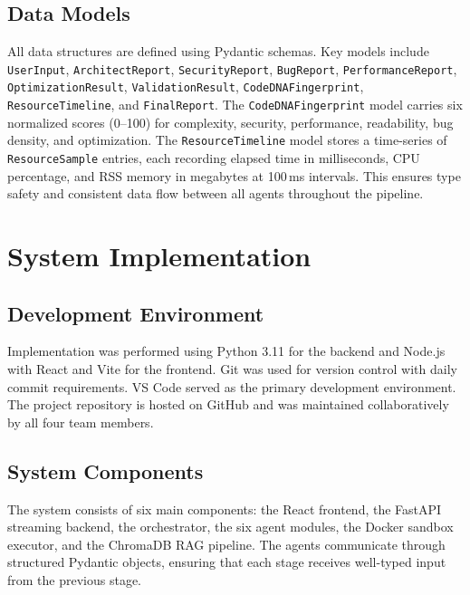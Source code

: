 \subsection{Data Models}
All data structures are defined using Pydantic schemas. Key models include \texttt{UserInput}, \texttt{ArchitectReport}, \texttt{SecurityReport}, \texttt{BugReport}, \texttt{PerformanceReport}, \texttt{OptimizationResult}, \texttt{ValidationResult}, \texttt{CodeDNAFingerprint}, \texttt{ResourceTimeline}, and \texttt{FinalReport}. The \texttt{CodeDNAFingerprint} model carries six normalized scores (0--100) for complexity, security, performance, readability, bug density, and optimization. The \texttt{ResourceTimeline} model stores a time-series of \texttt{ResourceSample} entries, each recording elapsed time in milliseconds, CPU percentage, and RSS memory in megabytes at 100\,ms intervals. This ensures type safety and consistent data flow between all agents throughout the pipeline.

\clearpage
\section{System Implementation}
\label{sec:implementation}

\subsection{Development Environment}
Implementation was performed using Python 3.11 for the backend and Node.js with React and Vite for the frontend. Git was used for version control with daily commit requirements. VS Code served as the primary development environment. The project repository is hosted on GitHub and was maintained collaboratively by all four team members.

\subsection{System Components}
The system consists of six main components: the React frontend, the FastAPI streaming backend, the orchestrator, the six agent modules, the Docker sandbox executor, and the ChromaDB RAG pipeline. The agents communicate through structured Pydantic objects, ensuring that each stage receives well-typed input from the previous stage.

